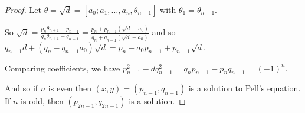 \documentclass[10pt,a4paper]{article}
\begin{document}
\begin{proof}
Let $\theta = \sqrt{d} = [a_0;a_1,\ldots, a_n, \theta_{n+1}]$ with $\theta_1=\theta_{n+1}$.

So $\sqrt{d} = \frac{p_n\theta_{n+1}+p_{n-1}}{q_n\theta_{n+1}+q_{n-1}} = \frac{p_n+p_{n-1}(\sqrt{d}-a_0)}{q_n+q_{n-1}(\sqrt{d}-a_0)}$ and so $q_{n-1}d + (q_n-q_{n-1}a_0)\sqrt{d} = p_n - a_0p_{n-1}+p_{n-1}\sqrt{d}$.

Comparing coefficients, we have $p_{n-1}^2 - dq_{n-1}^2 = q_np_{n-1}-p_nq_{n-1} = (-1)^n$.

And so if $n$ is even then $(x,y)=(p_{n-1},q_{n-1})$ is a solution to Pell's equation. If $n$ is odd, then $(p_{2n-1},q_{2n-1})$ is a solution.
\end{proof}
\end{document}
